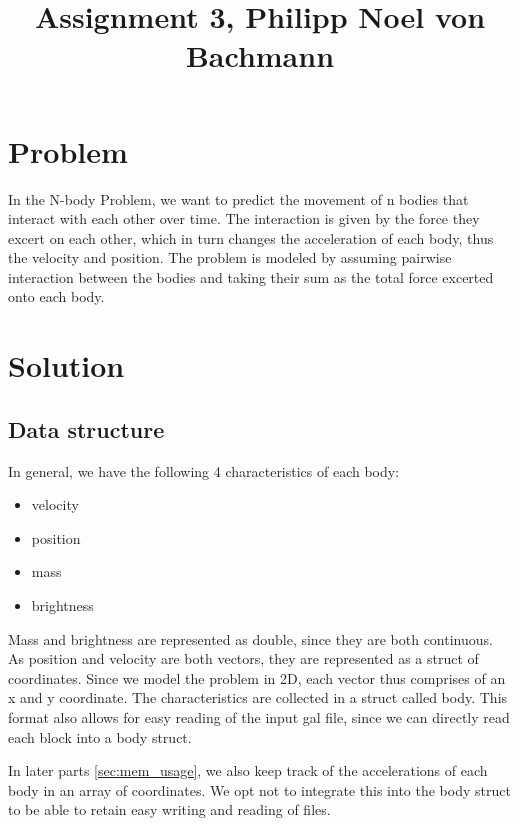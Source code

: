 \documentclass[a4paper]{scrartcl}
\title{Assignment 3, Philipp Noel von Bachmann}
\begin{document}
\maketitle

\section{Problem}
    In the N-body Problem, we want to predict the movement of n bodies that
    interact with each other over time. The interaction is given by the force
    they excert on each other, which in turn changes the acceleration of each
    body, thus the velocity and position. The problem is modeled by assuming
    pairwise interaction between the bodies and taking their sum as the total
    force excerted onto each body.

\section{Solution}
    \subsection{Data structure}
        In general, we have the following 4 characteristics of each body:
        \begin{itemize}
            \item velocity
            \item position
            \item mass
            \item brightness
        \end{itemize}
        Mass and brightness are represented as double, since they are both
        continuous. As position and velocity are both vectors, they are
        represented as a struct of coordinates. Since we model the problem in
        2D, each vector thus comprises of an x and y coordinate. The
        characteristics are collected in a struct called body. This format
        also allows for easy reading of the input gal file, since we can
        directly read each block into a body struct.

        In later parts \ref{sec:mem_usage}, we also keep track of the
        accelerations of each body in an array of coordinates. We opt not to
        integrate this into the body struct to be able to retain easy writing
        and reading of files.
\end{document}
